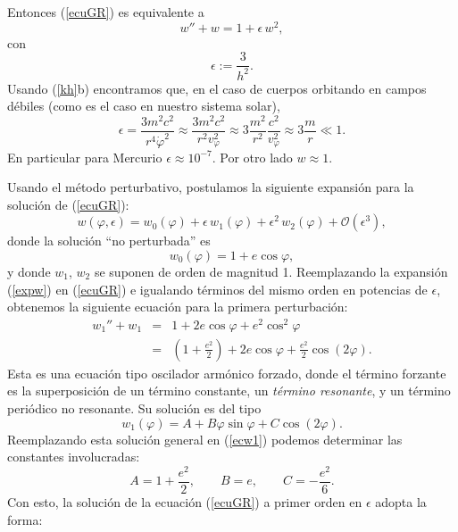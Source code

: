 Entonces (\ref{ecuGR})  es equivalente a
\begin{equation}
w''+w=1+\epsilon\,w^2 ,\label{ecwGR}
\end{equation}
con
\begin{equation}
 \epsilon:=\frac{3}{h^2}.
\end{equation}
Usando (\ref{kh}b) encontramos que, en el caso de cuerpos orbitando en campos
débiles (como es el caso en nuestro sistema solar),
\begin{equation}
 \epsilon=\frac{3m^2c^2}{r^4\dot\varphi^2}\approx\frac{3m^2c^2}{r^2v_\varphi^2}
 \approx 3\frac{m^2}{r^2}\frac{c^2}{v_\varphi^2}\approx 3\frac{m}{r}\ll 1.
\end{equation}
En particular para Mercurio $\epsilon\approx 10^{-7}$. Por otro lado $w\approx
1$.

Usando el método perturbativo, postulamos la siguiente expansión para la solución de (\ref{ecuGR}):
\begin{equation}
w(\varphi,\epsilon)=w_0(\varphi)+\epsilon\, w_1(\varphi) +\epsilon^2\,w_2(\varphi)+\mathcal{O}(\epsilon^3), \label{expw}
\end{equation}
donde la solución ``no perturbada'' es
\begin{equation}
 w_0(\varphi)=1+e\cos\varphi ,
\end{equation}
y donde $w_1$, $w_2$ se suponen de orden de magnitud 1. Reemplazando la expansión (\ref{expw}) en (\ref{ecuGR}) e igualando términos del mismo orden en potencias de $\epsilon$, obtenemos la siguiente ecuación para la primera perturbación:
\begin{eqnarray}
 w_1''+w_1&=&1+2e\cos\varphi+e^2\cos^2\varphi \\
&=& (1+\frac{e^2}{2})+2e\cos\varphi+\frac{e^2}{2}\cos(2\varphi). \label{ecw1}
\end{eqnarray}
Esta es una ecuación tipo oscilador armónico forzado, donde el término forzante es la superposición de un término constante, un \textit{término resonante}, y un término periódico no resonante. Su solución es del tipo
\begin{equation}
 w_1(\varphi)=A+B\varphi\sin\varphi+C\cos(2\varphi).
\end{equation}
Reemplazando esta solución general en (\ref{ecw1}) podemos determinar las constantes involucradas:
\begin{equation}
 A=1+\frac{e^2}{2}, \qquad B=e, \qquad C=-\frac{e^2}{6}.
\end{equation}
Con esto, la solución de la ecuación (\ref{ecuGR}) a primer orden en $\epsilon$ adopta la forma:
